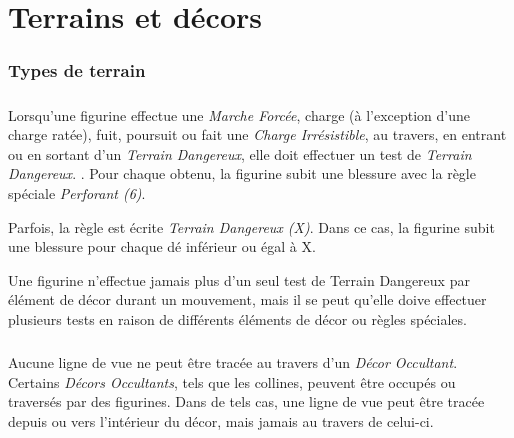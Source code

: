 
\part{Terrains et décors}

\section{Types de terrain}

\subsubsection*{}

Lorsqu'une figurine effectue une \emph{Marche Forcée}, charge (à l'exception d'une charge ratée), fuit, poursuit ou fait une \emph{Charge Irrésistible}, au travers, en entrant ou en sortant d'un \emph{Terrain Dangereux}, elle doit effectuer un test de \emph{Terrain Dangereux}. . Pour chaque  obtenu, la figurine subit une blessure avec la règle spéciale \emph{Perforant (6)}.

Parfois, la règle est écrite \emph{Terrain Dangereux (X)}. Dans ce cas, la figurine subit une blessure pour chaque dé inférieur ou égal à X.

Une figurine n'effectue jamais plus d'un seul test de Terrain Dangereux par élément de décor durant un mouvement, mais il se peut qu'elle doive effectuer plusieurs tests en raison de différents éléments de décor ou règles spéciales.

\subsubsection*{}

Aucune ligne de vue ne peut être tracée au travers d'un \emph{Décor Occultant}. Certains \emph{Décors Occultants}, tels que les collines, peuvent être occupés ou traversés par des figurines. Dans de tels cas, une ligne de vue peut être tracée depuis ou vers l'intérieur du décor, mais jamais au travers de celui-ci. 

\subsubsection*{}

